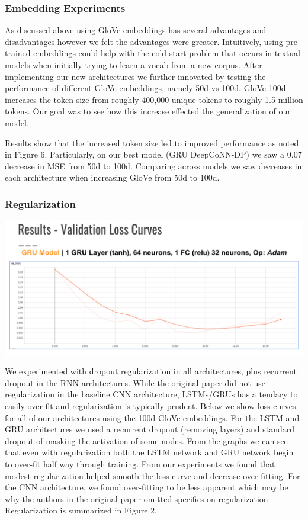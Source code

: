 \documentclass[10pt,twocolumn,letterpaper]{article}
\begin{document}
\subsubsection{Embedding Experiments}
As discussed above using GloVe embeddings has several advantages and disadvantages however we felt the advantages were greater. Intuitively, using pre-trained embeddings could help with the cold start problem that occurs in textual models when initially trying to learn a vocab from a new corpus. After implementing our new architectures we further innovated by testing the performance of different GloVe embeddings, namely 50d vs 100d. GloVe 100d increases the token size from roughly 400,000 unique tokens to roughly 1.5 million tokens. Our goal was to see how this increase effected the generalization of our model. 

Results show that the increased token size led to improved performance as noted in Figure 6. Particularly, on our best model (GRU DeepCoNN-DP) we saw a 0.07 decrease in MSE from 50d to 100d. Comparing across models we saw decreases in each architecture when increasing GloVe from 50d to 100d.\\

\subsubsection{Regularization}

\includegraphics[scale=0.38]{Loss_Graph.png}

We experimented with dropout regularization in all architectures, plus recurrent dropout in the RNN architectures. While the original paper did not use regularization in the baseline CNN architecture, LSTMs/GRUs has a tendacy to easily over-fit and regularization is typically prudent. Below we show loss curves for all of our architectures using the 100d GloVe embeddings. For the LSTM and GRU architectures we used a recurrent dropout (removing layers) and standard dropout of masking the activation of some nodes. From the graphs we can see that even with regularization both the LSTM network and GRU network begin to over-fit half way through training. From our experiments we found that modest regularization helped smooth the loss curve and decrease over-fitting. For the CNN architecture, we found over-fitting to be less apparent which may be why the authors in the original paper omitted specifics on regularization. Regularization is summarized in Figure 2.
\end{document}
